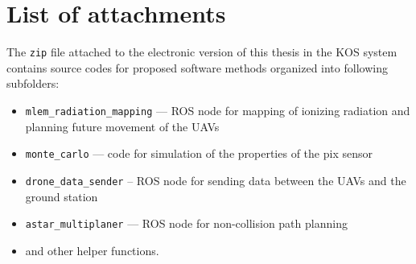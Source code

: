 \chapter{List of attachments}
The \verb|zip| file attached to the electronic version of this thesis in the KOS system contains source codes for proposed software methods organized into following subfolders:
\begin{itemize}
  \item \verb|mlem_radiation_mapping| --- \ac{ROS} node for mapping of ionizing radiation and planning future movement of the \acp{UAV}
  \item \verb|monte_carlo| --- code for simulation of the properties of the \ac{pix} sensor
  \item \verb|drone_data_sender| -- \ac{ROS} node for sending data between the \acp{UAV} and the ground station
  \item \verb|astar_multiplaner| --- \ac{ROS} node for non-collision path planning
  \item and other helper functions.
\end{itemize}

